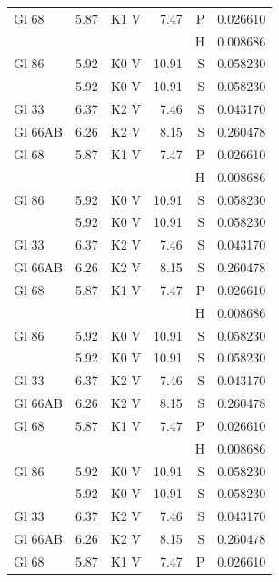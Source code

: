 \documentclass{aa}
\begin{document}
\begin{appendix}
\begin{longtable}{lllrrr}
		Gl 68     & 5.87    & K1 V     & 7.47     & P    & 0.026610   \\
		          &         &          &          & H    & 0.008686   \\
		Gl 86     & 5.92    & K0 V     & 10.91    & S    & 0.058230   \\            & 5.92 & K0 V & 10.91& S & 0.058230\\
		Gl 33     & 6.37    & K2 V     & 7.46     & S    & 0.043170   \\
		Gl 66AB   & 6.26    & K2 V     & 8.15     & S    & 0.260478   \\
		Gl 68     & 5.87    & K1 V     & 7.47     & P    & 0.026610   \\
		          &         &          &          & H    & 0.008686   \\
		Gl 86     & 5.92    & K0 V     & 10.91    & S    & 0.058230   \\
		          & 5.92    & K0 V     & 10.91    & S    & 0.058230   \\
		Gl 33     & 6.37    & K2 V     & 7.46     & S    & 0.043170   \\
		Gl 66AB   & 6.26    & K2 V     & 8.15     & S    & 0.260478   \\
		Gl 68     & 5.87    & K1 V     & 7.47     & P    & 0.026610   \\
		          &         &          &          & H    & 0.008686   \\
		Gl 86     & 5.92    & K0 V     & 10.91    & S    & 0.058230   \\            & 5.92 & K0 V & 10.91& S & 0.058230\\
		Gl 33     & 6.37    & K2 V     & 7.46     & S    & 0.043170   \\
		Gl 66AB   & 6.26    & K2 V     & 8.15     & S    & 0.260478   \\
		Gl 68     & 5.87    & K1 V     & 7.47     & P    & 0.026610   \\
		          &         &          &          & H    & 0.008686   \\
		Gl 86     & 5.92    & K0 V     & 10.91    & S    & 0.058230   \\            & 5.92 & K0 V & 10.91& S & 0.058230\\
		Gl 33     & 6.37    & K2 V     & 7.46     & S    & 0.043170   \\
		Gl 66AB   & 6.26    & K2 V     & 8.15     & S    & 0.260478   \\
		Gl 68     & 5.87    & K1 V     & 7.47     & P    & 0.026610   \\

\end{longtable}
\end{appendix}
\end{document}
